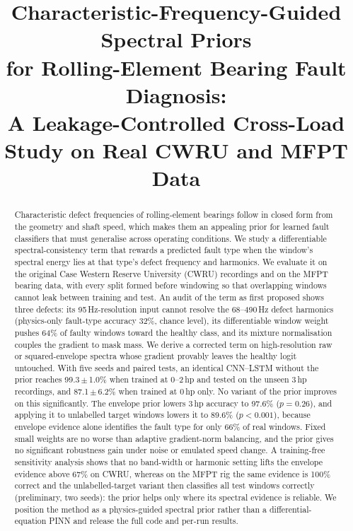 \documentclass[conference]{IEEEtran}
\begin{document}
\title{Characteristic-Frequency-Guided Spectral Priors\\
for Rolling-Element Bearing Fault Diagnosis:\\
A Leakage-Controlled Cross-Load Study on Real CWRU and MFPT Data}

\author{
}

\maketitle

\begin{abstract}
Characteristic defect frequencies of rolling-element bearings follow in closed
form from the geometry and shaft speed, which makes them an appealing prior for
learned fault classifiers that must generalise across operating conditions. We
study a differentiable spectral-consistency term that rewards a predicted
fault type when the window's spectral energy lies at that type's defect
frequency and harmonics. We evaluate it on the original Case Western Reserve
University (CWRU) recordings and on the MFPT bearing data, with every split
formed before windowing so that overlapping windows cannot leak between
training and test. An audit of the term as first proposed shows three defects:
its 95\,Hz-resolution input cannot resolve the 68--490\,Hz defect harmonics
(physics-only fault-type accuracy 32\%, chance level), its differentiable
window weight pushes 64\% of faulty windows toward the healthy class, and its
mixture normalisation couples the gradient to mask mass. We derive a corrected
term on high-resolution raw or squared-envelope spectra whose gradient provably
leaves the healthy logit untouched. With five seeds and paired tests, an
identical CNN--LSTM without the prior reaches 99.3\,$\pm$\,1.0\% when trained at
0--2\,hp and tested on the unseen 3\,hp recordings, and 87.1\,$\pm$\,6.2\% when
trained at 0\,hp only. No variant of the prior improves on this significantly.
The envelope prior lowers 3\,hp accuracy to 97.6\% ($p=0.26$), and applying it
to unlabelled target windows lowers it to 89.6\% ($p<0.001$), because envelope
evidence alone identifies the fault type for only 66\% of real windows. Fixed
small weights are no worse than adaptive gradient-norm balancing, and the prior
gives no significant robustness gain under noise or emulated speed change. A
training-free sensitivity analysis shows that no band-width or harmonic setting
lifts the envelope evidence above 67\% on CWRU, whereas on the MFPT rig the same
evidence is 100\% correct and the unlabelled-target variant then classifies all
test windows correctly (preliminary, two seeds): the prior helps only where its
spectral evidence is reliable. We position the method as a physics-guided spectral prior rather than a
differential-equation PINN and release the full code and per-run results.
\end{abstract}
\end{document}
